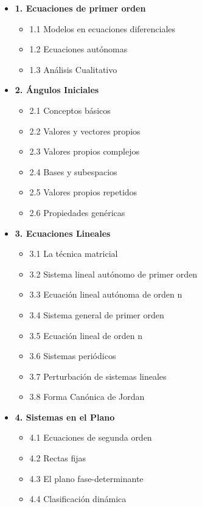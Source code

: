 \documentclass[10pt,a4paper]{article}
\begin{document}
\begin{itemize}
    \item \textbf{1. Ecuaciones de primer orden}
    \begin{itemize}
        \item 1.1 Modelos en ecuaciones diferenciales
        \item 1.2 Ecuaciones autónomas
        \item 1.3 Análisis Cualitativo
    \end{itemize}

    \item \textbf{2. Ángulos Iniciales}
    \begin{itemize}
        \item 2.1 Conceptos básicos
        \item 2.2 Valores y vectores propios
        \item 2.3 Valores propios complejos
        \item 2.4 Bases y subespacios
        \item 2.5 Valores propios repetidos
        \item 2.6 Propiedades genéricas
    \end{itemize}

    \item \textbf{3. Ecuaciones Lineales}
    \begin{itemize}
        \item 3.1 La técnica matricial
        \item 3.2 Sistema lineal autónomo de primer orden
        \item 3.3 Ecuación lineal autónoma de orden n
        \item 3.4 Sistema general de primer orden
        \item 3.5 Ecuación lineal de orden n
        \item 3.6 Sistemas periódicos
        \item 3.7 Perturbación de sistemas lineales
        \item 3.8 Forma Canónica de Jordan
    \end{itemize}

    \item \textbf{4. Sistemas en el Plano}
    \begin{itemize}
        \item 4.1 Ecuaciones de segunda orden
        \item 4.2 Rectas fijas
        \item 4.3 El plano fase-determinante
        \item 4.4 Clasificación dinámica
    \end{itemize}


\end{itemize}
\end{document}
